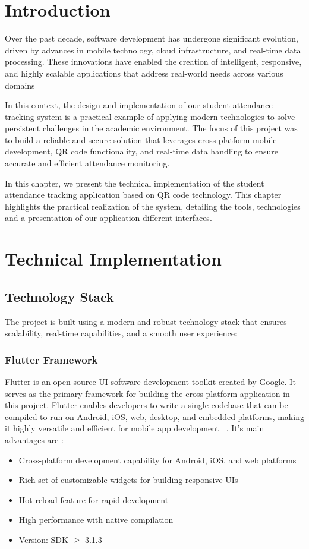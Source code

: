 \section{Introduction}
Over the past decade, software development has undergone significant evolution, driven by advances in mobile technology, cloud infrastructure, and real-time data processing. These innovations have enabled the creation of intelligent, responsive, and highly scalable applications that address real-world needs across various domains

In this context, the design and implementation of our student attendance tracking system is a practical example of applying modern technologies to solve persistent challenges in the academic environment. The focus of this project was to build a reliable and secure solution that leverages cross-platform mobile development, QR code functionality, and real-time data handling to ensure accurate and efficient attendance monitoring.

In this chapter, we present the technical implementation of the student attendance tracking application based on QR code technology. This chapter highlights the practical realization of the system, detailing the tools, technologies and a presentation of our application different interfaces.

\section{Technical Implementation}

\subsection{Technology Stack}
The project is built using a modern and robust technology stack that ensures scalability, real-time capabilities, and a smooth user experience:

\subsubsection{Flutter Framework}
Flutter is an open-source UI software development toolkit created by Google. It serves as the primary framework for building the cross-platform application in this project. Flutter enables developers to write a single codebase that can be compiled to run on Android, iOS, web, desktop, and embedded platforms, making it highly versatile and efficient for mobile app development~\cite{flutterDocs} .
It's main advantages are :
\begin{itemize}
    \item Cross-platform development capability for Android, iOS, and web platforms
    \item Rich set of customizable widgets for building responsive UIs
    \item Hot reload feature for rapid development
    \item High performance with native compilation
    \item Version: SDK $\geq$ 3.1.3
\end{itemize}

